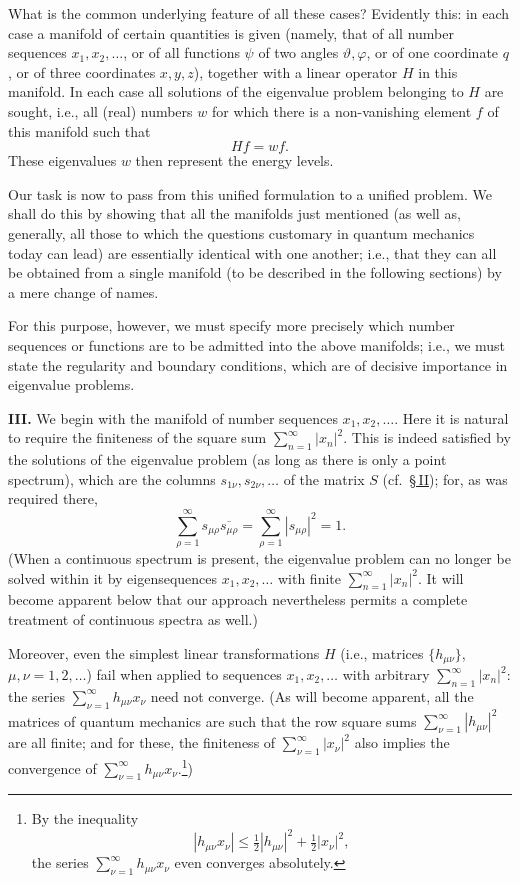 \documentclass[fontsize=13pt,paper=b5,twoside,bookmarkpackage=false]{scrartcl}
\newcommand{\articleSection}[1]{%
  \par\addvspace{\medskipamount}\phantomsection\label{sec:#1}%
  \pdfbookmark[1]{Section #1}{section-#1}%
  \noindent\textbf{#1.}\enspace\ignorespaces}
\newcommand{\Sec}[1]{\hyperref[sec:#1]{\S\,#1}}
\begin{document}
What is the common underlying feature of all these cases? Evidently this: in each case a manifold of certain quantities is given (namely, that of all number sequences $x_1,x_2,\ldots$, or of all functions $\psi$ of two angles $\vartheta,\varphi$, or of one coordinate $q$, or of three coordinates $x,y,z$), together with a linear operator $H$ in this manifold. In each case all solutions of the eigenvalue problem belonging to $H$ are sought, i.e., all (real) numbers $w$ for which there is a non-vanishing element $f$ of this manifold such that
\[
Hf=wf.
\]
These eigenvalues $w$ then represent the energy levels.

Our task is now to pass from this unified formulation to a unified problem. We shall do this by showing that all the manifolds just mentioned (as well as, generally, all those to which the questions customary in quantum mechanics today can lead) are essentially identical with one another; i.e., that they can all be obtained from a single manifold (to be described in the following sections) by a mere change of names.

For this purpose, however, we must specify more precisely which number sequences or functions are to be admitted into the above manifolds; i.e., we must state the regularity and boundary conditions, which are of decisive importance in eigenvalue problems.

\articleSection{III}
We begin with the manifold of number sequences $x_1,x_2,\ldots$. Here it is natural to require the finiteness of the square sum $\sum_{n=1}^{\infty}|x_n|^2$. This is indeed satisfied by the solutions of the eigenvalue problem (as long as there is only a point spectrum), which are the columns $s_{1\nu},s_{2\nu},\ldots$ of the matrix $S$ (cf.\ \Sec{II}); for, as was required there,
\[
\sum_{\rho=1}^{\infty}s_{\mu\rho}\overline{s_{\mu\rho}}
=\sum_{\rho=1}^{\infty}|s_{\mu\rho}|^2=1.
\]
(When a continuous spectrum is present, the eigenvalue problem can no longer be solved within it by eigensequences $x_1,x_2,\ldots$ with finite $\sum_{n=1}^{\infty}|x_n|^2$. It will become apparent below that our approach nevertheless permits a complete treatment of continuous spectra as well.)

Moreover, even the simplest linear transformations $H$ (i.e., matrices $\{h_{\mu\nu}\}$, $\mu,\nu=1,2,\ldots$) fail when applied to sequences $x_1,x_2,\ldots$ with arbitrary $\sum_{n=1}^{\infty}|x_n|^2$: the series $\sum_{\nu=1}^{\infty}h_{\mu\nu}x_\nu$ need not converge. (As will become apparent, all the matrices of quantum mechanics are such that the row square sums $\sum_{\nu=1}^{\infty}|h_{\mu\nu}|^2$ are all finite; and for these, the finiteness of $\sum_{\nu=1}^{\infty}|x_\nu|^2$ also implies the convergence of $\sum_{\nu=1}^{\infty}h_{\mu\nu}x_\nu$.\footnote[11]{\label{fn:11}By the inequality
\[
|h_{\mu\nu}x_\nu|\le\tfrac12|h_{\mu\nu}|^2+\tfrac12|x_\nu|^2,
\]
the series $\sum_{\nu=1}^{\infty}h_{\mu\nu}x_\nu$ even converges absolutely.})
\end{document}
